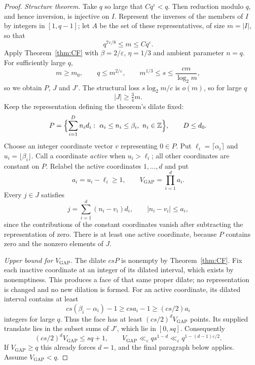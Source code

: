 \documentclass[11pt,letterpaper]{article}
\numberwithin{equation}{section}
\theoremstyle{plain}
\theoremstyle{remark}
\newcommand{\Z}{\mathbb Z}
\newcommand{\Vgap}{V_{\mathrm{GAP}}}
\begin{document}
\begin{proof}
\emph{Structure theorem.} Take $q$ so large that $Cq^\varepsilon<q$. Then reduction modulo $q$, and hence inversion, is injective on $I$. Represent the inverses of the members of $I$ by integers in $[1,q-1]$; let $A$ be the set of these representatives, of size $m=|I|$, so that
\[
q^{7\varepsilon/8}\le m\le Cq^\varepsilon .
\]
Apply Theorem~\ref{thm:CF} with $\beta=2/\varepsilon$, $\eta=1/3$ and ambient parameter $n=q$. For sufficiently large $q$,
\[
m\ge m_0,\qquad q\le m^{2/\varepsilon},\qquad m^{1/3}\le s\le\frac{cm}{\log_2m},
\]
so we obtain $P$, $J$ and $J'$. The structural loss $s\log_2m/c$ is $o(m)$, so for large $q$
\begin{equation}\label{eq:G1}
|J|\ge\tfrac34m .
\end{equation}
Keep the representation defining the theorem's dilate fixed:
\[
P=\Bigl\{\sum_{i=1}^{D}n_id_i:\ \alpha_i\le n_i\le\beta_i,\ n_i\in\Z\Bigr\},\qquad D\le d_0 .
\]
Choose an integer coordinate vector $v$ representing $0\in P$. Put $\ell_i=\lceil\alpha_i\rceil$ and $u_i=\lfloor\beta_i\rfloor$. Call a coordinate \emph{active} when $u_i>\ell_i$; all other coordinates are constant on $P$. Relabel the active coordinates $1,\ldots,d$ and put
\[
a_i=u_i-\ell_i\ge1,\qquad \Vgap=\prod_{i=1}^da_i .
\]
Every $j\in J$ satisfies
\begin{equation}\label{eq:jrep}
j=\sum_{i=1}^d(n_i-v_i)d_i,\qquad |n_i-v_i|\le a_i,
\end{equation}
since the contributions of the constant coordinates vanish after subtracting the representation of zero. There is at least one active coordinate, because $P$ contains zero and the nonzero elements of $J$.

\emph{Upper bound for $\Vgap$.} The dilate $csP$ is nonempty by Theorem~\ref{thm:CF}. Fix each inactive coordinate at an integer of its dilated interval, which exists by nonemptiness. This produces a face of that same proper dilate; no representation is changed and no new dilation is formed. For an active coordinate, its dilated interval contains at least
\[
cs(\beta_i-\alpha_i)-1\ge csa_i-1\ge(cs/2)a_i
\]
integers for large $q$. Thus the face has at least $(cs/2)^d\Vgap$ points. Its supplied translate lies in the subset sums of $J'$, which lie in $[0,sq]$. Consequently
\begin{equation}\label{eq:G2}
(cs/2)^d\Vgap\le sq+1,\qquad \Vgap\ll_\varepsilon qs^{1-d}\ll_\varepsilon q^{1-(d-1)\varepsilon/2}.
\end{equation}
If $\Vgap\ge q$ this already forces $d=1$, and the final paragraph below applies. Assume $\Vgap<q$.


\end{proof}
\end{document}
